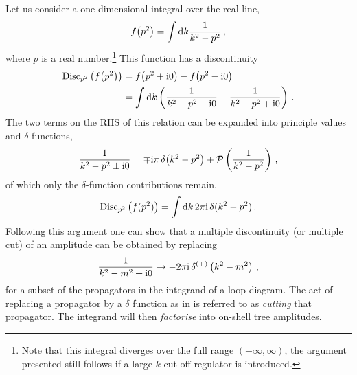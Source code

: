 Let us consider a one dimensional integral over the real line,
\begin{equation}
  f\bigl(p^2\bigr) = \int \mathrm{d} k \frac{1}{k^2-p^2} \,,
\end{equation}
where $p$ is a real number.\footnote{Note that this integral diverges over the
full range $(-\infty,\infty)$, the argument presented still follows if a large-$k$ cut-off regulator is introduced.} This function has a discontinuity
\begin{align}
  {\rm Disc}_{p^2}\left(f\bigl(p^2\bigr)\right)
  &= f\bigl(p^2+\mathrm{i}0\bigr)-f\bigl(p^2-\mathrm{i}0 \bigr) \nonumber\\
  &= \int \mathrm{d} k \left( \frac{1}{k^2-p^2-\mathrm{i} 0} - \frac{1}{k^2-p^2+\mathrm{i} 0} \right) \,.
\end{align}
The two terms on the RHS of this relation can be expanded into principle values and $\delta$ functions,
\begin{align}
  \frac{1}{k^2-p^2 \pm \mathrm{i} 0} = \mp \mathrm{i} \pi \, \delta\bigl(k^2-p^2\bigr) + \mathcal{P}\left( \frac{1}{k^2-p^2} \right) \,,
\end{align}
of which only the $\delta$-function contributions remain,
\begin{equation}
  {\rm Disc}_{p^2}\left(f(p^2)\right) = \int \mathrm{d} k \, 2\pi \mathrm{i} \, \delta(k^2-p^2) \,.
\end{equation}
Following this argument one can show that a multiple discontinuity (or
multiple cut) of an amplitude can be obtained by replacing
\begin{equation} \label{eq:cut_delta}
  \frac{1}{k^2-m^2+\mathrm{i}0} \rightarrow -2\pi\mathrm{i} \, \delta^{(+)}\left( k^2 - m^2 \right) \,,
\end{equation}
for a subset of the propagators in the integrand of a loop diagram. The act of replacing a
propagator by a $\delta$ function as in  is referred to as
\emph{cutting} that propagator.  The integrand will then \textit{factorise}
into on-shell tree amplitudes.

